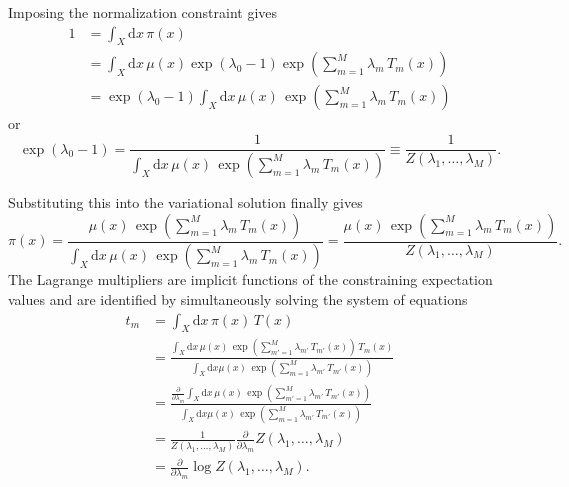 \documentclass[11pt, oneside]{article}
\begin{document}
Imposing the normalization constraint gives
%
\begin{align*}
1 
&= \int_{X} \mathrm{d} x \, \pi(x)
\\
&= \int_{X} \mathrm{d} x \, \mu(x)
\exp \left( \lambda_{0} - 1 \right)
\exp \left( \sum_{m = 1}^{M} \lambda_{m} \, T_{m}(x) \right)
\\
&= \exp \left( \lambda_{0} - 1 \right) \int_{X} \mathrm{d} x \, \mu(x) \,
\exp \left( \sum_{m = 1}^{M} \lambda_{m} \, T_{m}(x) \right)
\end{align*}
%
or
%
\begin{equation*}
\exp \left( \lambda_{0} - 1 \right) 
=
\frac{1}{ \int_{X} \mathrm{d} x \, \mu(x) \,
\exp \left( \sum_{m = 1}^{M} \lambda_{m} \, T_{m}(x) \right) }
\equiv
\frac{1}{Z(\lambda_{1}, \ldots, \lambda_{M})}.
\end{equation*}

Substituting this into the variational solution finally gives
%
\begin{equation*}
\pi(x) = 
\frac{ \mu(x) \, \exp \left( \sum_{m = 1}^{M} \lambda_{m} \, T_{m}(x) \right) }
{ \int_{X} \mathrm{d} x \,
\mu(x) \, \exp \left( \sum_{m = 1}^{M} \lambda_{m} \, T_{m}(x) \right) }
=
\frac{ \mu(x) \, \exp \left( \sum_{m = 1}^{M} \lambda_{m} \, T_{m}(x) \right) }
{ Z(\lambda_{1}, \ldots, \lambda_{M}) }.
\end{equation*}
%
The Lagrange multipliers are implicit functions of the 
constraining expectation values and are identified by
simultaneously solving the system of equations
%
\begin{align*}
t_{m} 
&= \int_{X} \mathrm{d} x \, \pi(x) \, T(x)
\\
&= 
\frac{ \int_{X} \mathrm{d} x \, 
\mu(x) \, \exp \left( \sum_{m' = 1}^{M} \lambda_{m'} \, T_{m'}(x) \right) \, T_{m}(x) }
{ \int_{X} \mathrm{d} x
\mu(x) \, \exp \left( \sum_{m = 1}^{M} \lambda_{m'} \, T_{m'}(x) \right) }
\\
&=
\frac{ \frac{\partial}{\partial \lambda_{m}} \int_{X} \mathrm{d} x \, 
\mu(x) \, \exp \left( \sum_{m' = 1}^{M} \lambda_{m'} \, T_{m'}(x) \right) }
{ \int_{X} \mathrm{d} x
\mu(x) \, \exp \left( \sum_{m = 1}^{M} \lambda_{m'} \, T_{m'}(x) \right) }
\\
&=
\frac{1}{ Z(\lambda_{1}, \ldots, \lambda_{M})}
\frac{\partial}{\partial \lambda_{m}}  Z(\lambda_{1}, \ldots, \lambda_{M})
\\
&=
\frac{\partial}{\partial \lambda_{m}} \log Z(\lambda_{1}, \ldots, \lambda_{M}).
\end{align*}
\end{document}
